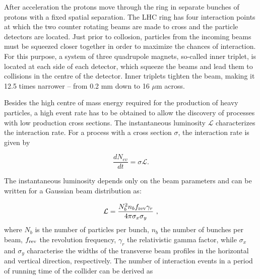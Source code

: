 After acceleration the protons move through the ring in separate bunches of protons with a fixed spatial separation.
The LHC ring has four interaction points at which the two counter rotating beams are made to cross and the particle detectors are located.
Just prior to collosion, particles from the incoming beams must be squeezed closer together in order to maximize the chances of interaction.
For this purpose, a system of three quadrupole magnets, so-called inner triplet, is located at each side of each detector, which squeeze the beams and lead them to collisions in the centre of the detector. Inner triplets tighten the beam, making it 12.5 times narrower – from 0.2 mm down to 16 $\mu$m across.

Besides the high centre of mass energy required for the production of heavy particles, a high event rate has to be obtained to allow the discovery of processes with low production cross sections. The instantaneous luminosity $\mathcal{L}$ characterizes the interaction rate. For a process with a cross section $\sigma$, the interaction rate is given by

\begin{equation}
\frac{dN_{ev}}{dt} = \sigma\mathcal{L}.
\end{equation}

The instantaneous luminosity depends only on the beam parameters and can be written for a Gaussian beam distribution as:

\begin{equation}
\mathcal{L} = \frac{N_b^2n_bf_{\rm rev}\gamma_r}{4\pi\sigma_x\sigma_y}~\mathrm{,}
\end{equation}
where $N_b$ is the number of particles per bunch, $n_b$ the number of bunches per beam, $f_{\rm rev}$ the revolution frequency,
$\gamma_r$ the relativistic gamma factor, while $\sigma_x$ and $\sigma_y$ characterise the widths of the transverse beam profiles in the horizontal and vertical direction, respectively. The number of interaction events in a period of running time of the collider can be derived as

